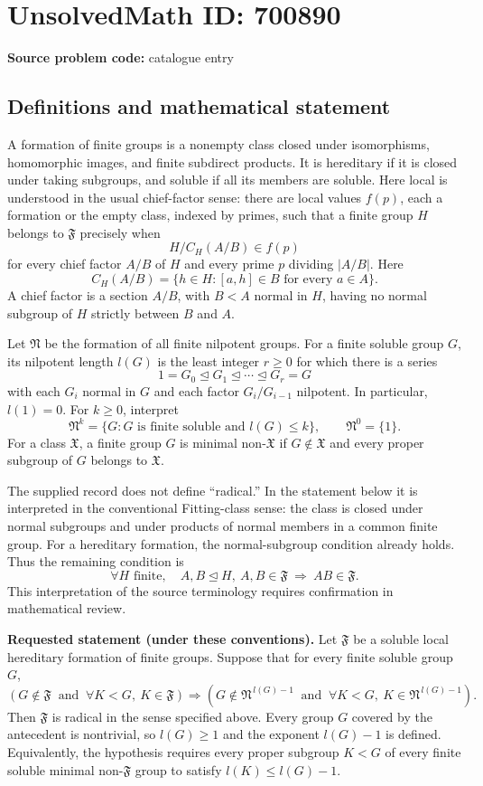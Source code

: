 \documentclass[11pt]{article}
\begin{document}
\section*{UnsolvedMath ID: 700890}
\textbf{Source problem code:} catalogue entry
\subsection{Definitions and mathematical statement}
A formation of finite groups is a nonempty class closed under isomorphisms, homomorphic images, and finite subdirect products. It is hereditary if it is closed under taking subgroups, and soluble if all its members are soluble. Here local is understood in the usual chief-factor sense: there are local values \(f(p)\), each a formation or the empty class, indexed by primes, such that a finite group \(H\) belongs to \(\mathfrak F\) precisely when
\[
 H/C_H(A/B)\in f(p)
\]
for every chief factor \(A/B\) of \(H\) and every prime \(p\) dividing \(|A/B|\). Here
\[
 C_H(A/B)=\{h\in H:[a,h]\in B\text{ for every }a\in A\}.
\]
A chief factor is a section \(A/B\), with \(B<A\) normal in \(H\), having no normal subgroup of \(H\) strictly between \(B\) and \(A\).

Let \(\mathfrak N\) be the formation of all finite nilpotent groups. For a finite soluble group \(G\), its nilpotent length \(l(G)\) is the least integer \(r\geq 0\) for which there is a series
\[
 1=G_0\trianglelefteq G_1\trianglelefteq\cdots\trianglelefteq G_r=G
\]
with each \(G_i\) normal in \(G\) and each factor \(G_i/G_{i-1}\) nilpotent. In particular, \(l(1)=0\). For \(k\geq 0\), interpret
\[
 \mathfrak N^k=\{G:G\text{ is finite soluble and }l(G)\leq k\},
 \qquad \mathfrak N^0=\{1\}.
\]
For a class \(\mathfrak X\), a finite group \(G\) is minimal non-\(\mathfrak X\) if \(G\notin\mathfrak X\) and every proper subgroup of \(G\) belongs to \(\mathfrak X\).

The supplied record does not define ``radical.'' In the statement below it is interpreted in the conventional Fitting-class sense: the class is closed under normal subgroups and under products of normal members in a common finite group. For a hereditary formation, the normal-subgroup condition already holds. Thus the remaining condition is
\[
 \forall H\text{ finite},\quad
 A,B\trianglelefteq H,\ A,B\in\mathfrak F
 \ \Longrightarrow\ AB\in\mathfrak F.
\]
This interpretation of the source terminology requires confirmation in mathematical review.

\textbf{Requested statement (under these conventions).}
Let \(\mathfrak F\) be a soluble local hereditary formation of finite groups. Suppose that for every finite soluble group \(G\),
\[
 \left(G\notin\mathfrak F\ \text{ and }\ \forall K<G,\ K\in\mathfrak F\right)
 \Longrightarrow
 \left(G\notin\mathfrak N^{\,l(G)-1}\ \text{ and }\
 \forall K<G,\ K\in\mathfrak N^{\,l(G)-1}\right).
\]
Then \(\mathfrak F\) is radical in the sense specified above. Every group \(G\) covered by the antecedent is nontrivial, so \(l(G)\geq 1\) and the exponent \(l(G)-1\) is defined. Equivalently, the hypothesis requires every proper subgroup \(K<G\) of every finite soluble minimal non-\(\mathfrak F\) group to satisfy \(l(K)\leq l(G)-1\).
\end{document}
